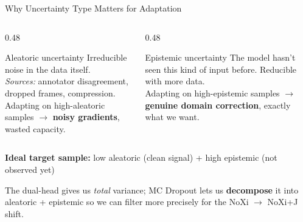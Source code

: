 \documentclass[aspectratio=169]{beamer}
\newcommand{\hl}[1]{\textcolor{coolpurple}{\textbf{#1}}}
\begin{document}
	\begin{frame}{Why Uncertainty Type Matters for Adaptation}
		\begin{columns}
			\begin{column}{0.48\textwidth}
				\begin{block}{Aleatoric uncertainty}
					Irreducible noise in the data itself. \\
					\textit{Sources:} annotator disagreement, dropped frames, compression. \\
					\vspace{0.3em}
					Adapting on high-aleatoric samples $\to$ \hl{noisy gradients}, wasted capacity.
				\end{block}
			\end{column}
			\begin{column}{0.48\textwidth}
				\begin{block}{Epistemic uncertainty}
					The model hasn't seen this kind of input before. Reducible with more data. \\
					\vspace{0.3em}
					Adapting on high-epistemic samples $\to$ \hl{genuine domain correction}, exactly what we want.
				\end{block}
			\end{column}
		\end{columns}
		\vspace{0.8em}
		\begin{center}
			\textbf{Ideal target sample:} low aleatoric (clean signal) + high epistemic (not observed yet)
		\end{center}
		\vspace{0.3em}
		The dual-head gives us \textit{total} variance; MC Dropout lets us \hl{decompose} it into aleatoric + epistemic so we can filter more precisely for the NoXi $\to$ NoXi+J shift.
	\end{frame}
	
\end{document}
